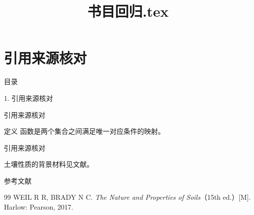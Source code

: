 \documentclass[aspectratio=169,10pt,fontset=fandol]{ctexbeamer}
\title{书目回归.tex}
\begin{document}
\section{引用来源核对}
\begin{frame}[t,fragile]{目录}
\normalsize
{\color{blue}\normalsize 1. 引用来源核对\par}\vspace{0.22em}
\end{frame}
\begin{frame}[t,fragile]{引用来源核对}
\normalsize
\begin{block}{定义}
{\normalsize
函数是两个集合之间满足唯一对应条件的映射。
}
\end{block}
\end{frame}
\begin{frame}[t,fragile]{引用来源核对}
\normalsize
{\normalsize

土壤性质的背景材料见文献\cite{BradyWeil}。


}
\end{frame}
\begin{frame}[t,fragile]{参考文献}
\normalsize
{\normalsize
\begin{thebibliography}{99}
 WEIL R R, BRADY N C. \emph{The Nature and Properties of Soils}（15th ed.）[M]. Harlow: Pearson, 2017.
\end{thebibliography}
}
\end{frame}
\end{document}
